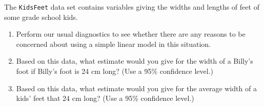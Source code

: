 \documentclass[twoside]{book}\usepackage[]{graphicx}\usepackage[]{xcolor}
\newcommand{\Rindex}[1]{\index{\texttt{#1}}}
\newcommand{\dataframe}[1]{{\color{blue!80!black}\texttt{#1}}\Rindex{#1}}
\begin{document}
\begin{problem}
	The \dataframe{KidsFeet} data set contains variables giving the widths and lengths
	of feet of some grade school kids.
	\begin{enumerate}
		\item
			Perform our usual diagnostics to see whether there are any reasons
			to be concerned about using a simple linear model in this situation.
		\item Based on this data, what estimate would you give for the width of a 
			Billy's foot if Billy's foot is 24 cm long?  
			(Use a 95\% confidence level.)
		\item Based on this data, what estimate would you give for the average width of a 
			kids' feet that 24 cm long?
			(Use a 95\% confidence level.)
	\end{enumerate}
\end{problem}
\end{document}
